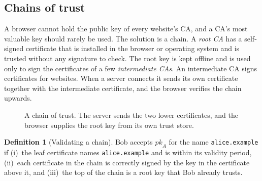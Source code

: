 \documentclass[11pt,a4paper]{article}
\theoremstyle{definition}
\newtheorem{definition}{Definition}[section]
\newcommand{\Ver}{\mathsf{Ver}}
\newcommand{\sk}{\mathit{sk}}
\newcommand{\pk}{\mathit{pk}}
\begin{document}
\subsection{Chains of trust}

A browser cannot hold the public key of every website's CA, and a CA's most valuable key should rarely be used. The solution is a chain. A \emph{root CA} has a self-signed certificate that is installed in the browser or operating system and is trusted without any signature to check. The root key is kept offline and is used only to sign the certificates of a few \emph{intermediate CAs}. An intermediate CA signs certificates for websites. When a server connects it sends its own certificate together with the intermediate certificate, and the browser verifies the chain upwards.

\begin{figure}[h]
\centering
{}
\caption{A chain of trust. The server sends the two lower certificates, and the browser supplies the root key from its own trust store.}\label{fig:chain}
\end{figure}

\begin{definition}[Validating a chain]
Bob accepts $\pk_A$ for the name \texttt{alice.example} if (i)~the leaf certificate names \texttt{alice.example} and is within its validity period, (ii)~each certificate in the chain is correctly signed by the key in the certificate above it, and (iii)~the top of the chain is a root key that Bob already trusts.
\end{definition}
\end{document}
